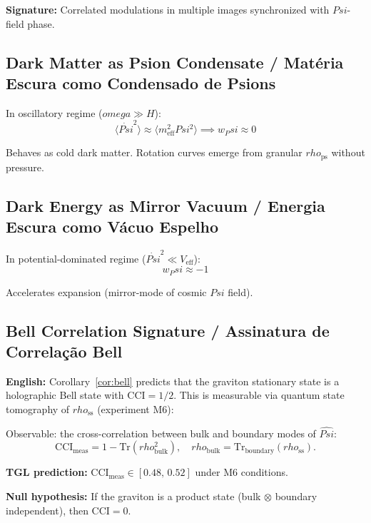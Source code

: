 \documentclass[12pt,a4paper]{article}
\def\Psi{Psi}%
\def\rho{rho}%
\def\omega{omega}%
\begin{document}
\textbf{Signature:} Correlated modulations in multiple images synchronized with $\Psi$-field phase.

\subsection{Dark Matter as Psion Condensate / Matéria Escura como Condensado de Psions}

In oscillatory regime ($\omega \gg H$):
\begin{equation}
\langle\dot{\Psi}^2\rangle \approx \langle m_{\text{eff}}^2\Psi^2\rangle \implies w_\Psi \approx 0
\end{equation}

Behaves as cold dark matter. Rotation curves emerge from granular $\rho_{\text{ps}}$ without pressure.

\subsection{Dark Energy as Mirror Vacuum / Energia Escura como Vácuo Espelho}

In potential-dominated regime ($\dot{\Psi}^2 \ll V_{\text{eff}}$):
\begin{equation}
w_\Psi \approx -1
\end{equation}

Accelerates expansion (mirror-mode of cosmic $\Psi$ field).

\subsection{Bell Correlation Signature / Assinatura de Correlação Bell}

\textbf{English:} Corollary~\ref{cor:bell} predicts that the graviton stationary state is a holographic Bell state with $\mathrm{CCI} = 1/2$. This is measurable via quantum state tomography of $\rho_{\mathrm{ss}}$ (experiment M6):

Observable: the cross-correlation between bulk and boundary modes of $\hat{\Psi}$:
\begin{equation}
\mathrm{CCI}_{\mathrm{meas}} = 1 - \mathrm{Tr}(\rho_{\mathrm{bulk}}^2), \quad
\rho_{\mathrm{bulk}} = \mathrm{Tr}_{\mathrm{boundary}}(\rho_{\mathrm{ss}}).
\end{equation}

\textbf{TGL prediction:} $\mathrm{CCI}_{\mathrm{meas}} \in [0.48,\, 0.52]$ under M6 conditions.

\textbf{Null hypothesis:} If the graviton is a product state (bulk $\otimes$ boundary independent), then $\mathrm{CCI} = 0$.
\end{document}
